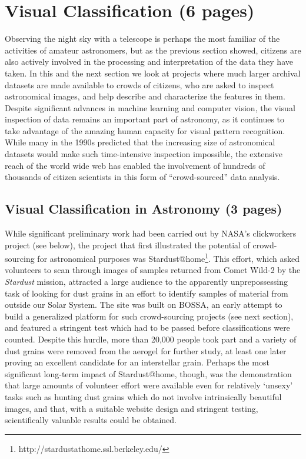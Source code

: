 \documentclass{ar2e}
\begin{document}



\section{Visual Classification (6 pages)}
\label{sec:class}

Observing the night sky with a telescope is perhaps the most familiar of the
activities of amateur astronomers, but as the previous section showed, citizens
are also actively involved in the processing and interpretation of the data they
have taken.  In this and the next section we look at projects where much larger
archival datasets are made available to crowds of citizens, who are asked to
inspect astronomical images, and help describe and characterize the features in
them. Despite significant advances in machine learning and computer vision, the
visual inspection of data remains an important part of astronomy, as it
continues to take advantage of the amazing human capacity for visual pattern
recognition. While many in the 1990s predicted that the increasing size of
astronomical datasets would make such time-intensive inspection impossible, the
extensive reach of the world wide web has enabled the involvement of hundreds of
thousands of citizen scientists in this form of ``crowd-sourced'' data
analysis. 


\subsection{Visual Classification in Astronomy (3 pages)}
\label{sec:class:astro}

While significant preliminary work had been carried out by NASA's clickworkers
project (see below), the project that first illustrated the potential of
crowd-sourcing for astronomical purposes was Stardust@home\footnote{http://stardustathome.ssl.berkeley.edu/}. This effort, which
asked volunteers to scan through images of samples returned from Comet Wild-2
by the \emph{Stardust} mission, attracted a large audience to the apparently
unprepossessing task of looking for dust grains in an effort to identify
samples of material from outside our Solar System. The site was built on
BOSSA, an early attempt to build a generalized platform for such crowd-sourcing
projects (see next section), and featured a stringent test which had to be
passed before classifications were counted. Despite this hurdle, more than
20,000 people took part and a variety of dust grains were removed from the
aerogel for further study, at least one later proving an excellent candidate
for an interstellar grain. Perhaps the most significant long-term impact of
Stardust@home, though, was the demonstration that large amounts of volunteer
effort were available even for relatively `unsexy' tasks such as hunting dust
grains which do not involve intrinsically beautiful images, and that, with a
suitable website design and stringent testing, scientifically valuable results
could be obtained. 
\end{document}
